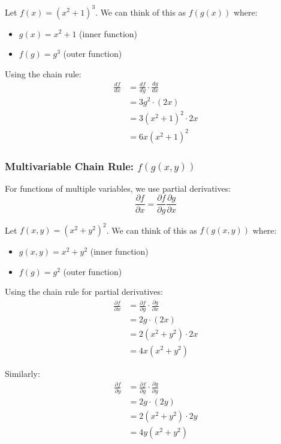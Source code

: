 \begin{example}
Let $f(x) = (x^2 + 1)^3$. We can think of this as $f(g(x))$ where:
\begin{itemize}
    \item $g(x) = x^2 + 1$ (inner function)
    \item $f(g) = g^3$ (outer function)
\end{itemize}

Using the chain rule:
\begin{align}
\frac{df}{dx} &= \frac{df}{dg} \cdot \frac{dg}{dx} \\
&= 3g^2 \cdot (2x) \\
&= 3(x^2 + 1)^2 \cdot 2x \\
&= 6x(x^2 + 1)^2
\end{align}
\end{example}

\subsubsection{Multivariable Chain Rule: $f(g(x,y))$}

For functions of multiple variables, we use partial derivatives:
\begin{equation}
\frac{\partial f}{\partial x} = \frac{\partial f}{\partial g} \frac{\partial g}{\partial x}
\end{equation}

\begin{example}
Let $f(x,y) = (x^2 + y^2)^2$. We can think of this as $f(g(x,y))$ where:
\begin{itemize}
    \item $g(x,y) = x^2 + y^2$ (inner function)
    \item $f(g) = g^2$ (outer function)
\end{itemize}

Using the chain rule for partial derivatives:
\begin{align}
\frac{\partial f}{\partial x} &= \frac{\partial f}{\partial g} \cdot \frac{\partial g}{\partial x} \\
&= 2g \cdot (2x) \\
&= 2(x^2 + y^2) \cdot 2x \\
&= 4x(x^2 + y^2)
\end{align}

Similarly:
\begin{align}
\frac{\partial f}{\partial y} &= \frac{\partial f}{\partial g} \cdot \frac{\partial g}{\partial y} \\
&= 2g \cdot (2y) \\
&= 2(x^2 + y^2) \cdot 2y \\
&= 4y(x^2 + y^2)
\end{align}
\end{example}


